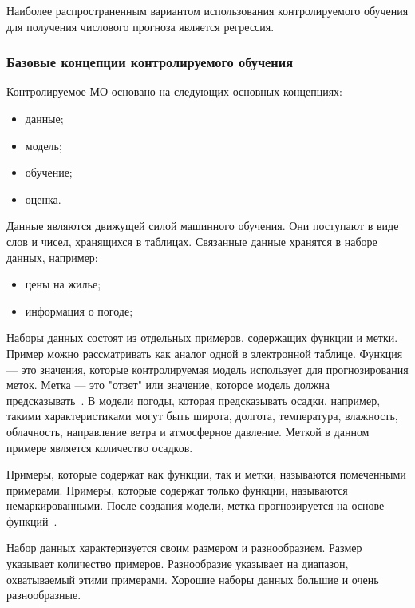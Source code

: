 Наиболее распространенным вариантом использования контролируемого обучения для получения числового прогноза является регрессия.

\subsubsection{Базовые концепции контролируемого обучения}

Контролируемое МО основано на следующих основных концепциях:
\begin{itemize}
    \item данные;
    \item модель;
    \item обучение;
    \item оценка.
\end{itemize}


Данные являются движущей силой машинного обучения.
Они поступают в виде слов и чисел, хранящихся в таблицах.
Связанные данные хранятся в наборе данных, например:
\begin{itemize}
    \item цены на жилье;
    \item информация о погоде;
\end{itemize}

Наборы данных состоят из отдельных примеров, содержащих функции и метки.
Пример можно рассматривать как аналог одной в электронной таблице.
Функция --- это значения, которые контролируемая модель использует для прогнозирования меток.
Метка --- это "ответ" или значение, которое модель должна предсказывать~\cite{google1}.
В модели погоды, которая предсказывать осадки, например, такими характеристиками могут быть широта, долгота, температура, влажность, облачность, направление ветра и атмосферное давление.
Меткой в данном примере является количество осадков.

Примеры, которые содержат как функции, так и метки, называются помеченными примерами.
Примеры, которые содержат только функции, называются немаркированными.
После создания модели, метка прогнозируется на основе функций~\cite{google}.


Набор данных характеризуется своим размером и разнообразием.
Размер указывает количество примеров.
Разнообразие указывает на диапазон, охватываемый этими примерами.
Хорошие наборы данных большие и очень разнообразные.

